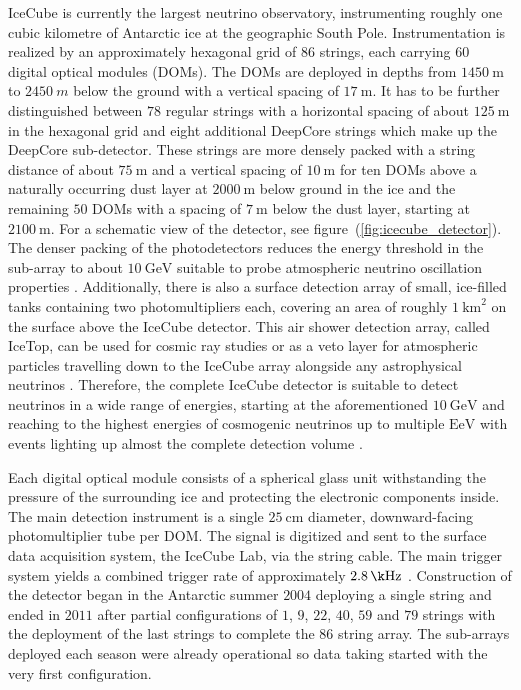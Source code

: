 IceCube is currently the largest neutrino observatory, instrumenting roughly one cubic kilometre of Antarctic ice at the geographic South Pole.
Instrumentation is realized by an approximately hexagonal grid of $\num{86}$ strings, each carrying $\num{60}$ digital optical modules (DOMs).
The DOMs are deployed in depths from $\SI{1450}{\m}$ to $\SI{2450}{m}$ below the ground with a vertical spacing of $\SI{17}{\m}$.
It has to be further distinguished between $\num{78}$ regular strings with a horizontal spacing of about $\SI{125}{\m}$ in the hexagonal grid and eight additional DeepCore strings which make up the DeepCore sub-detector.
These strings are more densely packed with a string distance of about $\SI{75}{\m}$ and a vertical spacing of $\SI{10}{\m}$ for ten DOMs above a naturally occurring dust layer at $\SI{2000}{\m}$ below ground in the ice and the remaining $\num{50}$ DOMs with a spacing of $\SI{7}{\m}$ below the dust layer, starting at $\SI{2100}{\m}$.
For a schematic view of the detector, see figure~(\ref{fig:icecube_detector}).
The denser packing of the photodetectors reduces the energy threshold in the sub-array to about $\SI{10}{\GeV}$ suitable to probe atmospheric neutrino oscillation properties \cite{Aartsen:2016nxy,Wiebusch:2009DeepCore}.
Additionally, there is also a surface detection array of small, ice-filled tanks containing two photomultipliers each, covering an area of roughly $\SI{1}{\km\squared}$ on the surface above the IceCube detector.
This air shower detection array, called IceTop, can be used for cosmic ray studies or as a veto layer for atmospheric particles travelling down to the IceCube array alongside any astrophysical neutrinos \cite{IceCube:2012nn}.
Therefore, the complete IceCube detector is suitable to detect neutrinos in a wide range of energies, starting at the aforementioned $\SI{10}{\GeV}$ and reaching to the highest energies of cosmogenic neutrinos up to multiple $\si{\exa\eV}$ with events lighting up almost the complete detection volume \cite{Aartsen:2013dsm}.

Each digital optical module consists of a spherical glass unit withstanding the pressure of the surrounding ice and protecting the electronic components inside.
The main detection instrument is a single $\SI{25}{\cm}$ diameter, downward-facing photomultiplier tube per DOM.
The signal is digitized and sent to the surface data acquisition system, the IceCube Lab, via the string cable.
The main trigger system yields a combined trigger rate of approximately $\SI{2.8}{\k\Hz}$ \cite{Aartsen:2016nxy}.
Construction of the detector began in the Antarctic summer $\num{2004}$ deploying a single string and ended in $\num{2011}$ after partial configurations of $\num{1}$, $\num{9}$, $\num{22}$, $\num{40}$, $\num{59}$ and $\num{79}$ strings with the deployment of the last strings to complete the $\num{86}$ string array.
The sub-arrays deployed each season were already operational so data taking started with the very first configuration\cite{Aartsen:2016nxy}.

